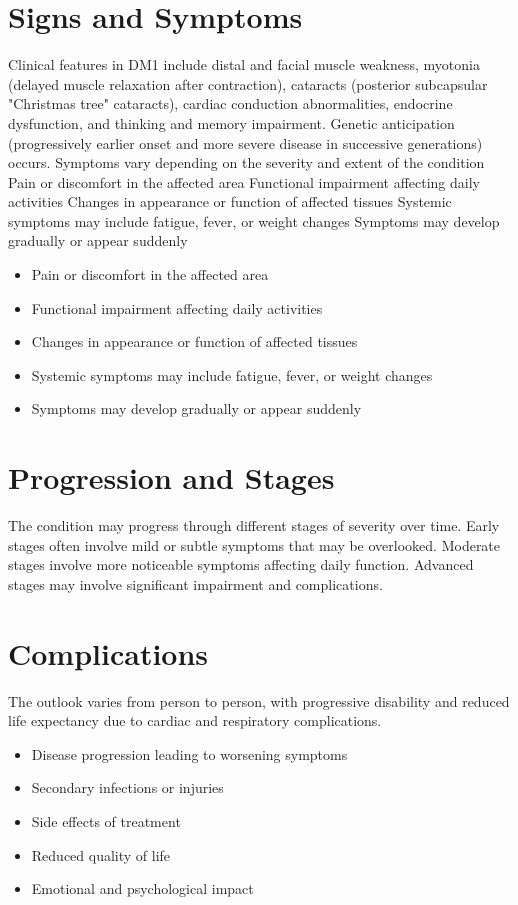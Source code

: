 \section{Signs and Symptoms}
Clinical features in DM1 include distal and facial muscle weakness, myotonia (delayed muscle relaxation after contraction), cataracts (posterior subcapsular "Christmas tree" cataracts), cardiac conduction abnormalities, endocrine dysfunction, and thinking and memory impairment. Genetic anticipation (progressively earlier onset and more severe disease in successive generations) occurs. Symptoms vary depending on the severity and extent of the condition Pain or discomfort in the affected area Functional impairment affecting daily activities Changes in appearance or function of affected tissues Systemic symptoms may include fatigue, fever, or weight changes Symptoms may develop gradually or appear suddenly

\begin{itemize}[noitemsep]
  \item Pain or discomfort in the affected area
  \item Functional impairment affecting daily activities
  \item Changes in appearance or function of affected tissues
  \item Systemic symptoms may include fatigue, fever, or weight changes
  \item Symptoms may develop gradually or appear suddenly
\end{itemize}
\section{Progression and Stages}
The condition may progress through different stages of severity over time. Early stages often involve mild or subtle symptoms that may be overlooked. Moderate stages involve more noticeable symptoms affecting daily function. Advanced stages may involve significant impairment and complications.
\section{Complications}
The outlook varies from person to person, with progressive disability and reduced life expectancy due to cardiac and respiratory complications.

\begin{itemize}[noitemsep]
  \item Disease progression leading to worsening symptoms
  \item Secondary infections or injuries
  \item Side effects of treatment
  \item Reduced quality of life
  \item Emotional and psychological impact
\end{itemize}

